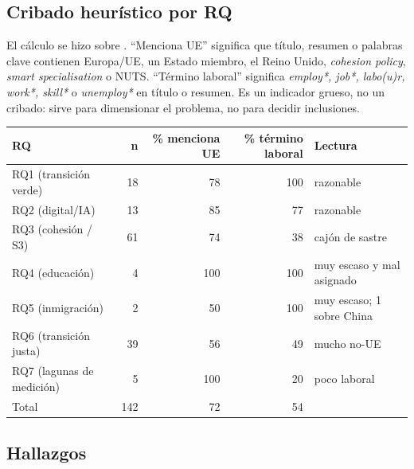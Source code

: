 \documentclass[11pt,a4paper]{article}
\begin{document}
\subsection{Cribado heurístico por RQ}

El cálculo se hizo sobre . ``Menciona UE'' significa que título, resumen o palabras clave contienen Europa/UE, un Estado miembro, el Reino Unido, \emph{cohesion policy}, \emph{smart specialisation} o NUTS. ``Término laboral'' significa \emph{employ*, job*, labo(u)r, work*, skill*} o \emph{unemploy*} en título o resumen. Es un indicador grueso, no un cribado: sirve para dimensionar el problema, no para decidir inclusiones.

\begin{center}
\begin{tabular}{lrrrl}
\toprule
\textbf{RQ} & \textbf{n} & \textbf{\% menciona UE} & \textbf{\% término laboral} & \textbf{Lectura}\\
\midrule
RQ1 (transición verde) & 18 & 78 & 100 & razonable\\
RQ2 (digital/IA) & 13 & 85 & 77 & razonable\\
RQ3 (cohesión / S3) & 61 & 74 & 38 & \textcolor{crit}{cajón de sastre}\\
RQ4 (educación) & 4 & 100 & 100 & \textcolor{crit}{muy escaso y mal asignado}\\
RQ5 (inmigración) & 2 & 50 & 100 & \textcolor{crit}{muy escaso; 1 sobre China}\\
RQ6 (transición justa) & 39 & 56 & 49 & \textcolor{alto}{mucho no-UE}\\
RQ7 (lagunas de medición) & 5 & 100 & 20 & \textcolor{alto}{poco laboral}\\
\midrule
Total & 142 & 72 & 54 & \\
\bottomrule
\end{tabular}
\end{center}

\subsection{Hallazgos}
\end{document}
